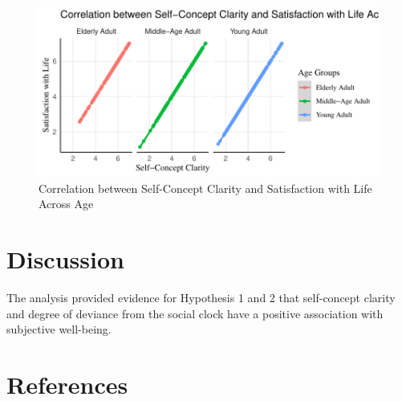 \documentclass[
  man,floatsintext]{apa6}
\begin{document}
\begin{figure}
\centering
\includegraphics{Exploring-the-Role-of-Deviance-on-Self-Concept-Clarity-Across-the-Lifespan-_files/figure-latex/SCCtoSWL-1.pdf}
\caption{\label{fig:SCCtoSWL}Correlation between Self-Concept Clarity and Satisfaction with Life Across Age}
\end{figure}

\hypertarget{discussion}{%
\section{Discussion}\label{discussion}}

The analysis provided evidence for Hypothesis 1 and 2 that self-concept clarity and degree of deviance from the social clock have a positive association with subjective well-being.

\newpage

\hypertarget{references}{%
\section{References}\label{references}}
\end{document}
